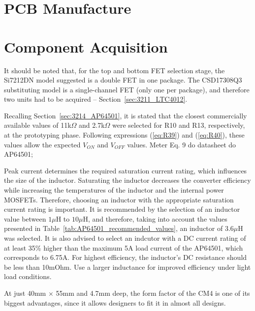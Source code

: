 \section{PCB Manufacture}\label{sec:51_PCBmanufacture}

\section{Component Acquisition}\label{sec:52_ComponentAcquisition}



It should be noted that, for the top and bottom FET selection stage, the Si7212DN model suggested is a double FET in one package. The CSD17308Q3 substituting model is a single-channel FET (only one per package), and therefore two units had to be acquired -- Section~\ref{sec:3211_LTC4012}.

Recalling Section~\ref{sec:3214_AP64501}, it is stated that the closest commercially available values of 11k$\Omega$ and 2.7k$\Omega$ were selected for R10 and R13, respectively, at the prototyping phase. Following expressions (\ref{eq:R39}) and (\ref{eq:R40}), these values allow the expected $V_{ON}$ and $V_{OFF}$ values.
    Meter Eq. 9 do datasheet do AP64501;
    
    Peak current determines the required saturation current rating, which influences the size of the inductor. Saturating the inductor decreases the converter efficiency while increasing the temperatures of the inductor and the internal power MOSFETs. Therefore, choosing an inductor with the appropriate saturation current rating is important. 
    It is recommended by \cite{AP64501} the selection of an inductor value between $1 \mu$H to $10 \mu$H, and therefore, taking into account the values presented in Table~\ref{tab:AP64501_recommended_values}, an inductor of $3.6 \mu$H was selected. It is also advised to select an indcutor with a DC current rating of at least 35\% higher than the maximum 5A load current of the AP64501, which corresponds to 6.75A.
    For highest efficiency, the inductor's DC resistance should be less than 10mOhm. Use a larger inductance for improved efficiency under light load conditions.


    At just 40mm $\times$ 55mm and 4.7mm deep, the form factor of the CM4 is one of its biggest advantages, since it allows designers to fit it in almost all designs.

